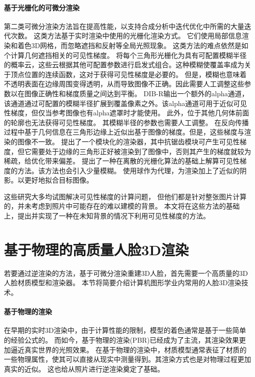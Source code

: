 \paragraph{基于光栅化的可微分渲染}
第二类可微分渲染方法旨在提高性能，以支持合成分析中迭代优化中所需的大量迭代次数。
这类方法基于实时渲染中使用的光栅化渲染方式。
它们使用局部信息渲染和着色3D网格，而忽略遮挡和反射等全局光照现象。
这类方法的难点依然是如个计算几何遮挡相关的可见性梯度。
\citet{softras}将每个三角形光栅化为具有可配置模糊半径的概率云，这些云根据其他可配置参数进行启发式组合。这种模糊使覆盖率成为关于顶点位置的连续函数，这对于获得可见性梯度是必要的。
但是，模糊也意味着不透明表面在边缘周围变得透明，从而导致图像不正确。因此需要人工调整这些参数以在图像正确性和梯度质量之间达到平衡。
DIB-R\citep{ChenLGSLJF19}输出一个额外的alpha通道，该通道通过可配置的模糊半径扩展到覆盖像素之外。该alpha通道可用于近似可见性梯度，但仅当参考图像也有alpha遮罩时才能使用。
此外，位于其他几何体前面的轮廓也无法获得可见性梯度。
其模糊半径的参数也需要人工调整。
\citet{KatoUH18}在反向传播过程中基于几何信息在三角形边缘上近似出基于图像的梯度。但是，这些梯度与渲染的图像不一致。
\citet{nvdiffrast}提出了一个模块化的渲染器，其中抗锯齿模块可产生可见性梯度，但它需要处于边缘的三角形正好被渲染到了图像中，否则其产生的梯度就较为稀疏，给优化带来偏差。
\citet{ColeGSVZ21}提出了一种在离散的光栅化算法的基础上解算可见性梯度的方法。该方法也会引入少量模糊。
\citet{LyuHL0TT21}使用球作为代理，为渲染加上了近似的阴影。以更好地拟合目标图像。

这些研究大多均试图解决可见性梯度的计算问题，
但他们都是针对整张图片计算的，并未考虑到照片中可能存在的难以建模的背景。
本文将在这些方法的基础上，提出并实现了一种在未知背景的情况下利用可见性梯度的方法。

\section{基于物理的高质量人脸3D渲染}

若要通过逆渲染的方法，基于可微分渲染重建3D人脸，首先需要一个高质量的3D人脸材质模型和渲染器。
本节将简要介绍计算机图形学业内常用的人脸3D渲染技术。

\paragraph{基于物理的渲染}

在早期的实时3D渲染中，由于计算性能的限制，模型的着色通常是基于一些简单的经验公式的。
而如今，基于物理的渲染(PBR)已经成为了主流，其渲染效果更加逼近真实世界的光照效果。
在基于物理的渲染中，材质模型通常表征了材质的一些物理属性，使其可以直接从现实中测量得到。其渲染方式也是对物理过程更加真实的近似。
这也给从照片进行逆渲染奠定了基础。

